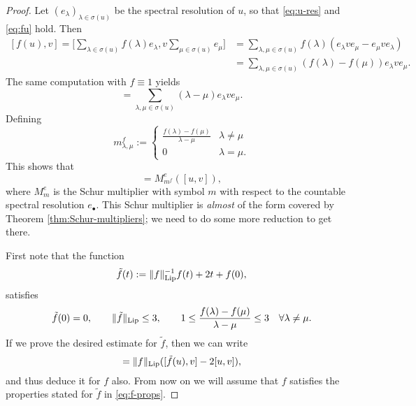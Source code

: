 \begin{proof}
  Let $(e_{\lambda})_{\lambda \in \sigma(u)}$ be the spectral resolution of $u$, so that \eqref{eq:u-res} and \eqref{eq:fu} hold.
  Then
  \begin{equation*}
    \begin{aligned}
      [f(u),v]
      = \big[ \sum_{\lambda \in \sigma(u)} f(\lambda) e_{\lambda},  v \sum_{\mu \in \sigma(u)} e_{\mu} \big] 
      &= \sum_{\lambda, \mu \in \sigma(u)} f(\lambda) (e_{\lambda} v e_{\mu} - e_{\mu} v e_{\lambda}) \\
      &= \sum_{\lambda, \mu \in \sigma(u)} (f(\lambda) - f(\mu)) e_{\lambda} v e_{\mu}.
    \end{aligned}
  \end{equation*}
  The same computation with $f \equiv 1$ yields
  \begin{equation*}
    [u,v] = \sum_{\lambda, \mu \in \sigma(u)} (\lambda - \mu) e_{\lambda} v e_{\mu}.
  \end{equation*}
  Defining
  \begin{equation*}
    m_{\lambda,\mu}^{f} :=
    \begin{cases}
      \frac{f(\lambda) - f(\mu)}{\lambda - \mu} & \lambda \neq \mu \\
      0 & \lambda = \mu.
    \end{cases}
  \end{equation*}
  This shows that
  \begin{equation*}
    [f(u),v] = M^{e}_{m^{f}}([u,v]),
  \end{equation*}
  where $M^{e}_{m}$ is the Schur multiplier with symbol $m$ with respect to the countable spectral resolution $e_{\bullet}$.
  This Schur multiplier is \emph{almost} of the form covered by Theorem \ref{thm:Schur-multipliers}; we need to do some more reduction to get there.
  
  First note that the function
  \begin{equation*}
    \tilde{f}(t) := \|f\|_{\mathrm{Lip}}^{-1} f(t) + 2t + f(0),
  \end{equation*}
  satisfies
  \begin{equation}\label{eq:f-props}
    \tilde{f}(0) = 0, \qquad  \|\tilde{f}\|_{\mathrm{Lip}} \leq 3, \qquad 1 \leq \frac{f(\lambda) - f(\mu)}{\lambda - \mu} \leq 3 \quad  \forall \lambda \neq \mu.
  \end{equation}
  If we prove the desired estimate for $\tilde{f}$, then we can write
  \begin{equation*}
    [f(u),v] = \|f\|_{\Lip}([\tilde{f}(u),v] - 2[u,v]), 
  \end{equation*}
  and thus deduce it for $f$ also.
  From now on we will assume that $f$ satisfies the properties stated for $\tilde{f}$ in \eqref{eq:f-props}.


\end{proof}
